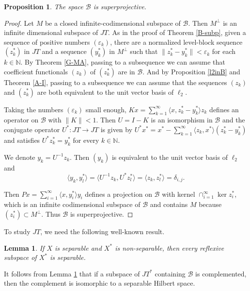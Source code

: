 \documentclass[12pt]{amsart}
\theoremstyle{plain}
\numberwithin{equation}{section}
\newcommand{\N}{\mathbb{N}}
\newcommand{\e}{\varepsilon}
\newcommand{\B}{\mathcal{B}}
\newtheorem{lemma}[theorem]{Lemma}
\newtheorem{proposition}[theorem]{Proposition}
\begin{document}
\begin{proposition}\label{Bsuper}
The space $\B$ is superprojective.
\end{proposition}
\begin{proof}
Let $M$ be a closed infinite-codimensional subspace of $\B$. Then $M^\perp$ is an infinite dimensional subspace of $JT$.
As in the proof of Theorem \ref{B-subp}, given a sequence of positive numbers $(\e_k)$, there are a normalized level-block sequence $(z^*_k)$
in $JT$ and a sequence $(y^*_k)$ in $M^\perp$ such that $\|z^*_k-y^*_k\|<\e_k$ for each $k\in \N$.
By Theorem \ref{G-MA}, passing to a subsequence we can assume that coefficient functionals $(z_k)$ of  $(z^*_k)$ are in $\B$.
And by Proposition \ref{l2inB} and Theorem \ref{A-I}, passing to a subsequence we can assume that the sequences $(z_k)$ and $(z^*_k)$ are both
equivalent to the unit vector basis of $\ell_2$.

Taking the numbers $(\e_k)$ small enough, $Kx=\sum_{k=1}^\infty \langle x,z^*_k-y^*_k\rangle z_k$ defines an operator on $\B$ with $\|K\|<1$.
Then $U = I-K$ is an isomorphism in $\B$ and the conjugate operator $U^*:JT\to JT$ is given by
$U^*x^*= x^*-\sum_{k=1}^\infty \langle z_k,x^*\rangle(z^*_k-y^*_k)$ and satisfies $U^*z^*_k=y^*_k$ for every $k\in \N$.

We denote $y_k=U^{-1}z_k$. Then $(y_k)$ is equivalent to the unit vector basis of $\ell_2$ and
$$
\langle y_k,y^*_l \rangle= \langle U^{-1}z_k,U^*z^*_l \rangle= \langle z_k,z^*_l \rangle = \delta_{i,j}.
$$

Then $Px= \sum_{i=1}^\infty \langle x,y^*_i\rangle y_i$ defines a projection on $\B$ with kernel $\cap_{i=1}^\infty \ker z^*_i$,
which is an infinite codimensional subspace of $\B$ and contains $M$ because $(z^*_i)\subset M^\perp$.
Thus $\B$ is superprojective.
\end{proof}

To study $JT$, we need the following well-known result.

\begin{lemma}\label{nonsepdual}
If $X$ is separable and $X^*$ is non-separable, then every reflexive subspace of $X^*$ is separable.
\end{lemma}

It follows from Lemma \ref{nonsepdual} that if a subspace of $JT^*$ containing $\B$ is complemented, then the complement is isomorphic to a separable Hilbert space.
\end{document}
